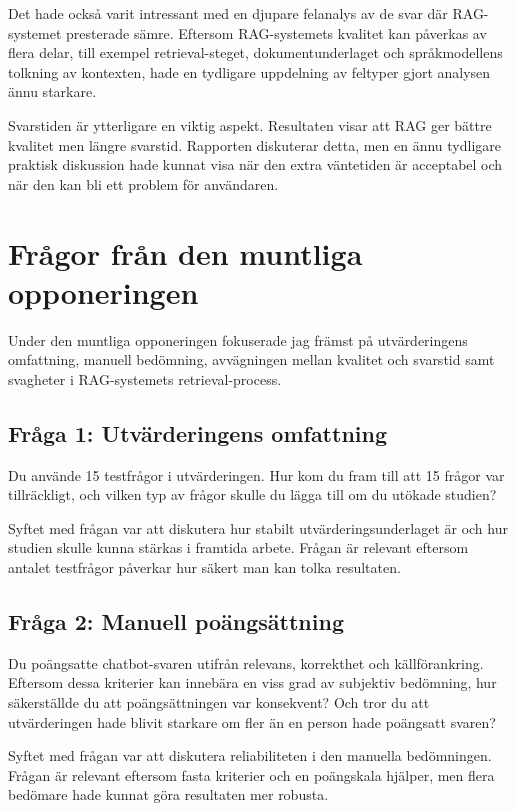 \documentclass[12pt,a4paper]{article}
\begin{document}
Det hade också varit intressant med en djupare felanalys av de svar där RAG-systemet presterade sämre. Eftersom RAG-systemets kvalitet kan påverkas av flera delar, till exempel retrieval-steget, dokumentunderlaget och språkmodellens tolkning av kontexten, hade en tydligare uppdelning av feltyper gjort analysen ännu starkare.

Svarstiden är ytterligare en viktig aspekt. Resultaten visar att RAG ger bättre kvalitet men längre svarstid. Rapporten diskuterar detta, men en ännu tydligare praktisk diskussion hade kunnat visa när den extra väntetiden är acceptabel och när den kan bli ett problem för användaren.

\section{Frågor från den muntliga opponeringen}

Under den muntliga opponeringen fokuserade jag främst på utvärderingens omfattning, manuell bedömning, avvägningen mellan kvalitet och svarstid samt svagheter i RAG-systemets retrieval-process.

\subsection{Fråga 1: Utvärderingens omfattning}

Du använde 15 testfrågor i utvärderingen. Hur kom du fram till att 15 frågor var tillräckligt, och vilken typ av frågor skulle du lägga till om du utökade studien?

Syftet med frågan var att diskutera hur stabilt utvärderingsunderlaget är och hur studien skulle kunna stärkas i framtida arbete. Frågan är relevant eftersom antalet testfrågor påverkar hur säkert man kan tolka resultaten.

\subsection{Fråga 2: Manuell poängsättning}

Du poängsatte chatbot-svaren utifrån relevans, korrekthet och källförankring. Eftersom dessa kriterier kan innebära en viss grad av subjektiv bedömning, hur säkerställde du att poängsättningen var konsekvent? Och tror du att utvärderingen hade blivit starkare om fler än en person hade poängsatt svaren?

Syftet med frågan var att diskutera reliabiliteten i den manuella bedömningen. Frågan är relevant eftersom fasta kriterier och en poängskala hjälper, men flera bedömare hade kunnat göra resultaten mer robusta.
\end{document}
